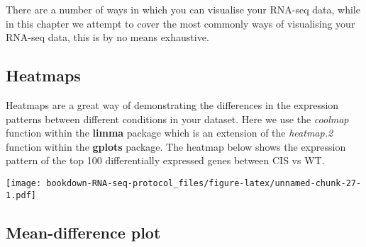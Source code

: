 \documentclass[]{book}
\newenvironment{Shaded}{\begin{snugshade}}{\end{snugshade}}
\newcommand{\CommentTok}[1]{\textcolor[rgb]{0.56,0.35,0.01}{\textit{#1}}}
\newcommand{\DataTypeTok}[1]{\textcolor[rgb]{0.13,0.29,0.53}{#1}}
\newcommand{\DecValTok}[1]{\textcolor[rgb]{0.00,0.00,0.81}{#1}}
\newcommand{\FloatTok}[1]{\textcolor[rgb]{0.00,0.00,0.81}{#1}}
\newcommand{\KeywordTok}[1]{\textcolor[rgb]{0.13,0.29,0.53}{\textbf{#1}}}
\newcommand{\NormalTok}[1]{#1}
\newcommand{\OperatorTok}[1]{\textcolor[rgb]{0.81,0.36,0.00}{\textbf{#1}}}
\newcommand{\StringTok}[1]{\textcolor[rgb]{0.31,0.60,0.02}{#1}}
\begin{document}
There are a number of ways in which you can visualise your RNA-seq data, while in this chapter we attempt to cover the most commonly ways of visualising your RNA-seq data, this is by no means exhaustive.

\hypertarget{heatmaps}{%
\subsection{Heatmaps}\label{heatmaps}}

Heatmaps are a great way of demonstrating the differences in the expression patterns between different conditions in your dataset. Here we use the \emph{coolmap} function within the \textbf{limma}
package which is an extension of the \emph{heatmap.2} function within the \textbf{gplots} package. The heatmap below shows the expression pattern of the top 100 differentially expressed genes between CIS vs WT.

\begin{Shaded}
\end{Shaded}

\texttt{[image: bookdown-RNA-seq-protocol\_files/figure-latex/unnamed-chunk-27-1.pdf]}

\hypertarget{mean-difference-plot}{%
\subsection{Mean-difference plot}\label{mean-difference-plot}}
\end{document}
